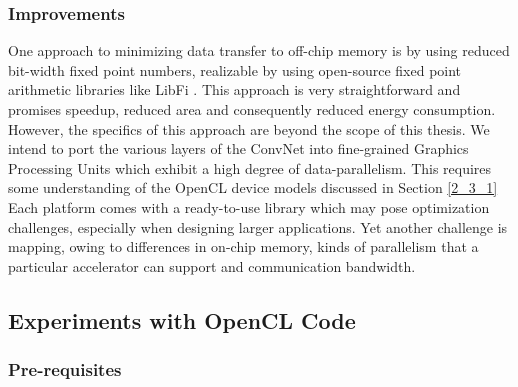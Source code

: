 \subsubsection{Improvements}
\label{3_1_2_3}
One approach to minimizing data transfer to off-chip memory is by using reduced bit-width fixed point numbers, realizable by using open-source fixed point arithmetic libraries like LibFi \cite{LibFi}. This approach is very straightforward and promises speedup, reduced area and consequently reduced energy consumption. However, the specifics of this approach are beyond the scope of this thesis. \newline \newline
We intend to port the various layers of the ConvNet into fine-grained Graphics Processing Units which exhibit a high degree of data-parallelism. This requires some understanding of the OpenCL device models discussed in Section \ref{2_3_1}
Each platform comes with a ready-to-use library which may pose optimization challenges, especially when designing larger applications.  Yet another challenge is mapping, owing to differences in on-chip memory, kinds of parallelism that a particular accelerator can support and communication bandwidth. 
\subsection{Experiments with OpenCL Code}
\label{3_1_3}
\subsubsection{Pre-requisites}
\label{3_1_3_1}
